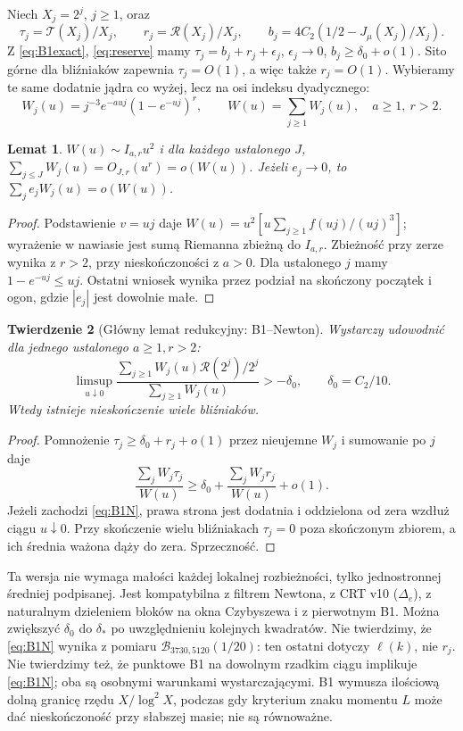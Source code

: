 \documentclass[11pt,a4paper]{article}
\newtheorem{tw}{Twierdzenie}[section]
\newtheorem{lem}[tw]{Lemat}
\theoremstyle{definition}\newtheorem{defn}[tw]{Definicja}
\theoremstyle{remark}\newtheorem*{uw}{Uwaga}
\newcommand{\R}{\mathcal R}
\newcommand{\B}{\mathcal B}
\newcommand{\T}{\mathcal T}
\begin{document}
Niech $X_j=2^j$, $j\ge1$, oraz
\[
 \tau_j=\T(X_j)/X_j,\qquad r_j=\R(X_j)/X_j,\qquad
 b_j=4C_2(1/2-J_\mu(X_j)/X_j).
\]
Z \eqref{eq:B1exact}, \eqref{eq:reserve} mamy
$\tau_j=b_j+r_j+\epsilon_j$, $\epsilon_j\to0$, $b_j\ge\delta_0+o(1)$.
Sito górne dla bliźniaków zapewnia $\tau_j=O(1)$, a więc także $r_j=O(1)$.
Wybieramy te same dodatnie jądra co wyżej, lecz na osi indeksu dyadycznego:
\begin{equation}\label{eq:Wj}
 W_j(u)=j^{-3}e^{-au j}(1-e^{-u j})^r,\qquad
 W(u)=\sum_{j\ge1}W_j(u),\quad a\ge1,\ r>2.
\end{equation}
\begin{lem}
$W(u)\sim I_{a,r}u^2$ i dla każdego ustalonego $J$,
$\sum_{j\le J}W_j(u)=O_{J,r}(u^r)=o(W(u))$.
Jeżeli $e_j\to0$, to $\sum_j e_jW_j(u)=o(W(u))$.
\end{lem}
\begin{proof}
Podstawienie $v=uj$ daje $W(u)=u^2[u\sum_{j\ge1}f(uj)/(uj)^3]$;
wyrażenie w nawiasie jest sumą Riemanna zbieżną do $I_{a,r}$.
Zbieżność przy zerze wynika z $r>2$, przy nieskończoności z $a>0$.
Dla ustalonego $j$ mamy $1-e^{-uj}\le uj$. Ostatni wniosek wynika przez
podział na skończony początek i ogon, gdzie $|e_j|$ jest dowolnie małe.
\end{proof}
\begin{tw}[Główny lemat redukcyjny: B1--Newton]\label{th:B1N}
Wystarczy udowodnić dla jednego ustalonego $a\ge1,r>2$:
\begin{equation}\label{eq:B1N}
 \boxed{\limsup_{u\downarrow0}
 \frac{\sum_{j\ge1}W_j(u)\R(2^j)/2^j}{\sum_{j\ge1}W_j(u)}>-\delta_0,
 \qquad \delta_0=C_2/10.}
\end{equation}
Wtedy istnieje nieskończenie wiele bliźniaków.
\end{tw}
\begin{proof}
Pomnożenie $\tau_j\ge\delta_0+r_j+o(1)$ przez nieujemne $W_j$ i sumowanie
po $j$ daje
\[
 \frac{\sum_j W_j\tau_j}{W(u)}\ge\delta_0+
 \frac{\sum_j W_j r_j}{W(u)}+o(1).
\]
Jeżeli zachodzi \eqref{eq:B1N}, prawa strona jest dodatnia i oddzielona
od zera wzdłuż ciągu $u\downarrow0$. Przy skończenie wielu bliźniakach
$\tau_j=0$ poza skończonym zbiorem, a ich średnia ważona dąży do zera.
Sprzeczność.
\end{proof}
Ta wersja nie wymaga małości każdej lokalnej rozbieżności, tylko jednostronnej
średniej podpisanej. Jest kompatybilna z filtrem Newtona, z CRT v10
($\Delta_e$), z naturalnym dzieleniem bloków na okna Czybyszewa i
z pierwotnym B1. Można zwiększyć $\delta_0$ do $\delta_*$ po uwzględnieniu
kolejnych kwadratów. Nie twierdzimy, że \eqref{eq:B1N} wynika z pomiaru
$\B_{3730,5120}(1/20)$: ten ostatni dotyczy $\ell(k)$, nie $r_j$.
Nie twierdzimy też, że punktowe B1 na dowolnym rzadkim ciągu implikuje
\eqref{eq:B1N}; oba są osobnymi warunkami wystarczającymi. B1 wymusza ilościową dolną granicę rzędu $X/\log^2 X$, podczas gdy kryterium znaku momentu $L$ może dać nieskończoność przy słabszej masie; nie są równoważne.
\end{document}
